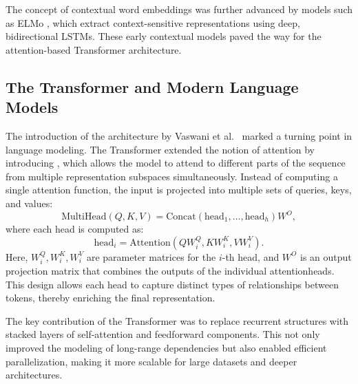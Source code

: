 The concept of contextual word embeddings was further advanced by models such as ELMo \citep{peters2018deep}, which extract context-sensitive representations using deep, bidirectional LSTMs. These early contextual models paved the way for the attention-based Transformer architecture.

\subsection{The Transformer and Modern Language Models}
The introduction of the  architecture by Vaswani et al.~\citep{vaswani2017attention} marked a turning point in language modeling. The Transformer extended the notion of attention by introducing , which allows the model to attend to different parts of the sequence from multiple representation subspaces simultaneously. Instead of computing a single attention function, the input is projected into multiple sets of queries, keys, and values:
\begin{equation}
\text{MultiHead}(Q, K, V) = \text{Concat}(\text{head}_1, \dots, \text{head}_h)W^O,
\end{equation}
where each head is computed as:
\begin{equation}
\text{head}_i = \text{Attention}(QW_i^Q, KW_i^K, VW_i^V).
\end{equation}
Here, $W_i^Q, W_i^K, W_i^V$ are parameter matrices for the $i$-th head, and $W^O$ is an output projection matrix that combines the outputs of the individual attentionheads. This design allows each head to capture distinct types of relationships between tokens, thereby enriching the final representation.

The key contribution of the Transformer was to replace recurrent structures with stacked layers of self-attention and feedforward components. This not only improved the modeling of long-range dependencies but also enabled efficient parallelization, making it more scalable for large datasets and deeper architectures.



